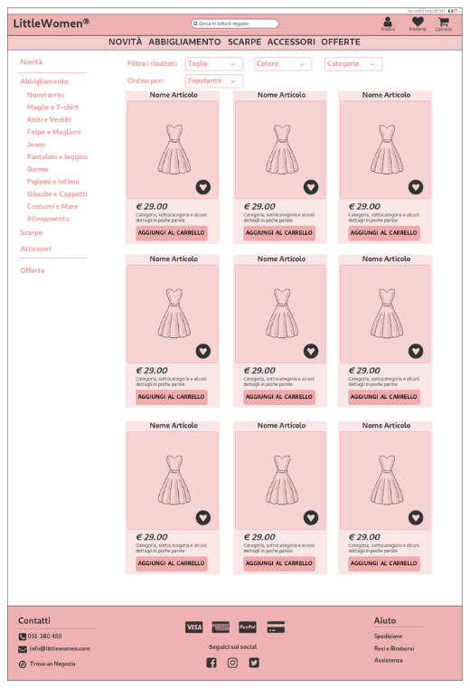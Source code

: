 \documentclass[12pt,a4paper]{report}
\begin{document}
\includegraphics[width=\textwidth]{"Project Management Sources/Wireframe/WireFrame Screenshot/Desktop/6 - Lista prodotti"}
\end{document}
